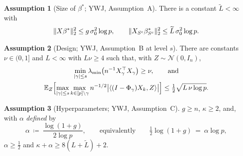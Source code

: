 \documentclass[aos]{imsart}
\DeclarePairedDelimiter{\norm}{\lVert}{\rVert}
\DeclarePairedDelimiter{\abs}{\lvert}{\rvert}
\newcommand{\bbE}[0]{\mathbb{E}}
\newcommand{\calN}[0]{\mathcal{N}}
\newcommand{\Ltil}{\widetilde{L}}
\theoremstyle{plain}
\theoremstyle{definition}
\newtheorem{assumption}{Assumption}[section]
\begin{document}
    \begin{assumption}[Size of $\beta^\ast$; YWJ, Assumption~A]
        \label{ass:A}
        There is a constant $\Ltil<\infty$ with
        \begin{equation*}
            \norm{X\beta^\ast}_2^{2}\leq g\,\sigma_0^{2}\log p,
            \qquad
            \norm{X_{S^{c}}\beta^\ast_{S^{c}}}_2^{2}
            \leq\Ltil\,\sigma_0^{2}\log p .
        \end{equation*}
    \end{assumption}

    \begin{assumption}[Design; YWJ, Assumption~B at level $s$]
        \label{ass:B}
        There are constants $\nu\in(0,1]$ and $L<\infty$ with
        $L\nu\geq4$ such that, with $Z\sim\calN(0,I_n)$,
        \begin{gather*}
            \min_{\abs{\gamma}\leq s}
            \lambda_{\min}\bigl(n^{-1}X_\gamma^{\top}X_\gamma\bigr)\geq\nu,
            \qquad\text{and}\\
            \bbE_Z\Bigl[\max_{\abs{\gamma}\leq s}
            \max_{k\in[p]\setminus\gamma}
            n^{-1/2}\bigl|\langle(I-\Phi_\gamma)X_k,Z\rangle\bigr|\Bigr]
            \leq\tfrac12\sqrt{L\,\nu\log p}.
        \end{gather*}
    \end{assumption}

    \begin{assumption}[Hyperparameters; YWJ, Assumption~C]
        \label{ass:C}
        $g\geq n$, $\kappa\geq2$, and, with $\alpha$ \emph{defined} by
        \begin{equation}
            \label{eq:alphadef}
            \alpha\ \coloneq\ \frac{\log(1+g)}{2\log p},
            \qquad\text{equivalently}\qquad
            \tfrac12\log(1+g)\ =\ \alpha\log p ,
        \end{equation}
        $\alpha\geq\tfrac12$ and $\kappa+\alpha\geq8(L+\Ltil)+2$.
    \end{assumption}
\end{document}
